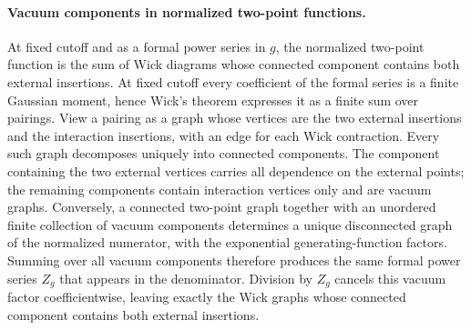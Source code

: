 \paragraph{Vacuum components in normalized two-point functions.}
At fixed cutoff and as a formal power series in \(g\), the normalized
two-point function is the sum of Wick diagrams whose connected component
contains both external insertions.
At fixed cutoff every coefficient of the formal series is a finite Gaussian
moment, hence Wick's theorem expresses it as a finite sum over pairings.
View a pairing as a graph whose vertices are the two external insertions and
the interaction insertions, with an edge for each Wick contraction.  Every
such graph decomposes uniquely into connected components.  The component
containing the two external vertices carries all dependence on the external
points; the remaining components contain interaction vertices only and are
vacuum graphs.  Conversely, a connected two-point graph together with an
unordered finite collection of vacuum components determines a unique
disconnected graph of the normalized numerator, with the exponential
generating-function factors.  Summing over all vacuum components therefore
produces the same formal power series \(Z_g\) that appears in the denominator.
Division by \(Z_g\) cancels this vacuum factor coefficientwise, leaving exactly
the Wick graphs whose connected component contains both external insertions.

\begin{center}
\end{center}

